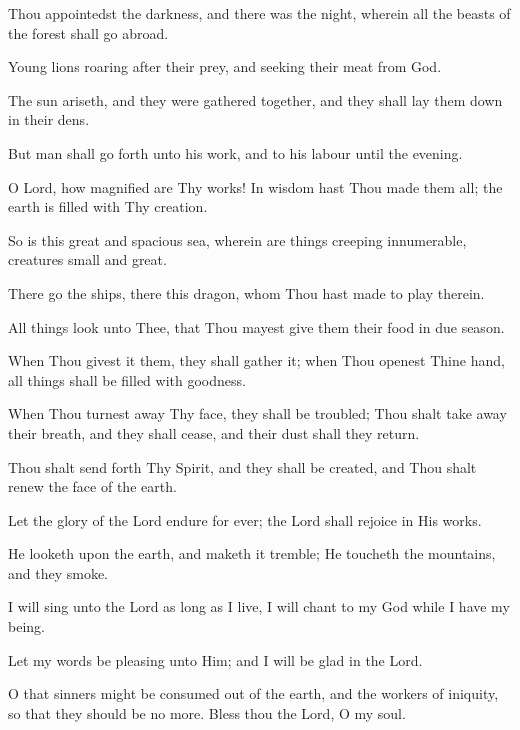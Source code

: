 Thou appointedst the darkness, and there was the night, wherein all the beasts of the forest shall go abroad.

Young lions roaring after their prey, and seeking their meat from God.

The sun ariseth, and they were gathered together, and they shall lay them down in their dens.

But man shall go forth unto his work, and to his labour until the evening.

O Lord, how magnified are Thy works! In wisdom hast Thou made them all; the earth is filled with Thy creation.

So is this great and spacious sea, wherein are things creeping innumerable, creatures small and great.

There go the ships, there this dragon, whom Thou hast made to play therein.

All things look unto Thee, that Thou mayest give them their food in due season.

When Thou givest it them, they shall gather it; when Thou openest Thine hand, all things shall be filled with goodness.

When Thou turnest away Thy face, they shall be troubled; Thou shalt take away their breath, and they shall cease, and their dust shall they return.

Thou shalt send forth Thy Spirit, and they shall be created, and Thou shalt renew the face of the earth.

Let the glory of the Lord endure for ever; the Lord shall rejoice in His works.

He looketh upon the earth, and maketh it tremble; He toucheth the mountains, and they smoke.

I will sing unto the Lord as long as I live, I will chant to my God while I have my being.

Let my words be pleasing unto Him; and I will be glad in the Lord.

O that sinners might be consumed out of the earth, and the workers of iniquity, so that they should be no more. Bless thou the Lord, O my soul.
